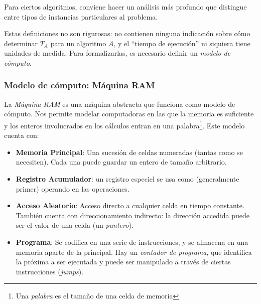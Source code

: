 \documentclass[a4paper]{report}
\begin{document}
Para ciertos algoritmos, conviene hacer un análisis más profundo que distingue entre tipos de instancias particulares al problema.

Estas definiciones no son rigurosas: no contienen ninguna indicación sobre cómo determinar $T_A$ para un algoritmo $A$, y el ``tiempo de ejecución'' ni siquiera tiene unidades de medida. Para formalizarlas, es necesario definir un \textit{modelo de cómputo}.

\subsubsection{Modelo de cómputo: Máquina RAM}

La \textit{Máquina RAM} es una máquina abstracta que funciona como modelo de cómputo. Nos permite modelar computadoras en las que la memoria es suficiente y los enteros involucrados en los cálculos entran en una palabra\footnote{Una \textit{palabra} es el tamaño de una celda de memoria}. Este modelo cuenta con:
\begin{itemize}
    \item \textbf{Memoria Principal}: Una sucesión de celdas numeradas (tantas como se necesiten). Cada una puede guardar un entero de tamaño arbitrario.
    \item \textbf{Registro Acumulador}: un registro especiel se usa como (generalmente primer) operando en las operaciones.
    \item \textbf{Acceso Aleatorio}: Acceso directo a cualquier celda en tiempo constante. También cuenta con direccionamiento indirecto: la dirección accedida puede ser el valor de una celda (un \textit{puntero}).
    \item \textbf{Programa}: Se codifica en una serie de instrucciones, y se almacena en una memoria aparte de la principal. Hay un \textit{contador de programa}, que identifica la próxima a ser ejecutada y puede ser manipulado a través de ciertas instrucciones (\textit{jumps}).
\end{itemize}
\end{document}

